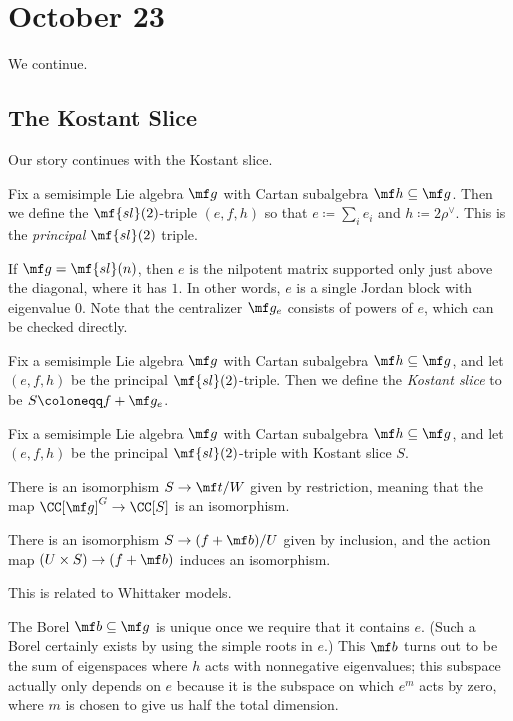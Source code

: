 \documentclass[../notes.tex]{subfiles}
\begin{document}
\section{October 23}
We continue.

\subsection{The Kostant Slice}
Our story continues with the Kostant slice.
\begin{definition}
	Fix a semisimple Lie algebra $\mf g$ with Cartan subalgebra $\mf h\subseteq\mf g$. Then we define the $\mf{sl}(2)$-triple $(e,f,h)$ so that $e\coloneqq\sum_ie_i$ and $h\coloneqq2\rho^\lor$. This is the \textit{principal $\mf{sl}(2)$} triple.
\end{definition}
\begin{example}
	If $\mf g=\mf{sl}(n)$, then $e$ is the nilpotent matrix supported only just above the diagonal, where it has $1$. In other words, $e$ is a single Jordan block with eigenvalue $0$. Note that the centralizer $\mf g_e$ consists of powers of $e$, which can be checked directly.
\end{example}
\begin{definition}
	Fix a semisimple Lie algebra $\mf g$ with Cartan subalgebra $\mf h\subseteq\mf g$, and let $(e,f,h)$ be the principal $\mf{sl}(2)$-triple. Then we define the \textit{Kostant slice} to be $S\coloneqq f+\mf g_e$.
\end{definition}
\begin{theorem} \label{thm:kostant-slice}
	Fix a semisimple Lie algebra $\mf g$ with Cartan subalgebra $\mf h\subseteq\mf g$, and let $(e,f,h)$ be the principal $\mf{sl}(2)$-triple with Kostant slice $S$.
	\begin{listalph}
		\item There is an isomorphism $S\to\mf t/W$ given by restriction, meaning that the map $\CC[\mf g]^G\to\CC[S]$ is an isomorphism.
		\item There is an isomorphism $S\to(f+\mf b)/U$ given by inclusion, and the action map $(U\times S)\to(f+\mf b)$ induces an isomorphism.
	\end{listalph}
\end{theorem}
\begin{remark}
	This is related to Whittaker models.
\end{remark}
\begin{remark}
	The Borel $\mf b\subseteq\mf g$ is unique once we require that it contains $e$. (Such a Borel certainly exists by using the simple roots in $e$.) This $\mf b$ turns out to be the sum of eigenspaces where $h$ acts with nonnegative eigenvalues; this subspace actually only depends on $e$ because it is the subspace on which $e^m$ acts by zero, where $m$ is chosen to give us half the total dimension.
\end{remark}
\end{document}
